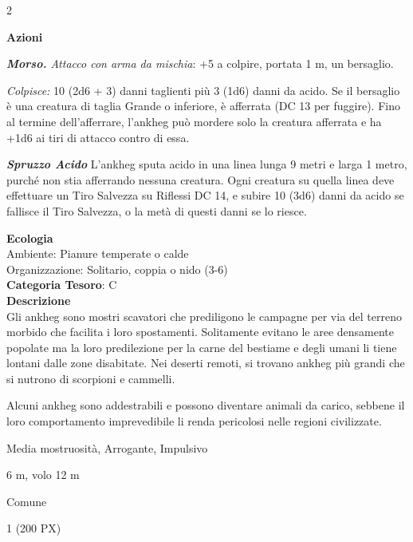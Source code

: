 \begin{multicols}{2}
{\textbf{Azioni}

\emph{\textbf{Morso.} Attacco con arma da mischia}: +5 a colpire, portata 1 m, un bersaglio.

\emph{Colpisce:} 10 (2d6 + 3) danni taglienti più 3 (1d6) danni da acido. Se il bersaglio è una creatura di taglia Grande o inferiore, è afferrata (DC 13 per fuggire). Fino al termine dell'afferrare, l'ankheg può mordere solo la creatura afferrata e ha +1d6 ai tiri di attacco contro di essa.

\emph{\textbf{Spruzzo Acido}} L'ankheg sputa acido in una linea lunga 9 metri e larga 1 metro, purché non stia afferrando nessuna creatura. Ogni creatura su quella linea deve effettuare un Tiro Salvezza su Riflessi DC 14, e subire 10 (3d6) danni da acido se fallisce il Tiro Salvezza, o la metà di questi danni se lo riesce.

\textbf{Ecologia}\\
Ambiente: Pianure temperate o calde\\
Organizzazione: Solitario, coppia o nido (3-6)\\
\textbf{Categoria Tesoro}: C\\
\textbf{Descrizione}\\
Gli ankheg sono mostri scavatori che prediligono le campagne per via del terreno morbido che facilita i loro spostamenti. Solitamente evitano le aree densamente popolate ma la loro predilezione per la carne del bestiame e degli umani li tiene lontani dalle zone disabitate. Nei deserti remoti, si trovano ankheg più grandi che si nutrono di scorpioni e cammelli.

Alcuni ankheg sono addestrabili e possono diventare animali da carico, sebbene il loro comportamento imprevedibile li renda pericolosi nelle regioni civilizzate.

\begin{description}[noitemsep, topsep=0pt, parsep=0pt, partopsep=0pt, itemsep=1pt, leftmargin=2.35cm,  labelwidth=2.2cm, itemindent=0cm, listparindent=0pt] %
\setlength{\baselineskip}{10pt}
\item[\textbf{Taglia/Tipo}] Media mostruosità, Arrogante, Impulsivo
\item[\textbf{Caratt.}] 
\item[\textbf{Punti Ferita}] 
\item[\textbf{Movimento}] 6 m, volo 12 m
\item[\textbf{Tiri Salvez.}] 
\item[\textbf{Linguaggi}] Comune
\item[\textbf{Sfida}] 1 (200 PX)
\end{description}
\smallskip

}
\end{multicols}
